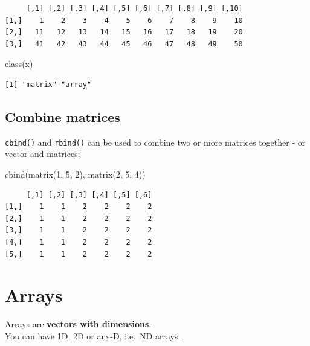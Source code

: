 \documentclass[
]{book}
\newenvironment{Shaded}{\begin{snugshade}}{\end{snugshade}}
\newcommand{\DecValTok}[1]{\textcolor[rgb]{0.00,0.00,0.81}{#1}}
\newcommand{\FunctionTok}[1]{\textcolor[rgb]{0.00,0.00,0.00}{#1}}
\newcommand{\NormalTok}[1]{#1}
\begin{document}
\begin{verbatim}
     [,1] [,2] [,3] [,4] [,5] [,6] [,7] [,8] [,9] [,10]
[1,]    1    2    3    4    5    6    7    8    9    10
[2,]   11   12   13   14   15   16   17   18   19    20
[3,]   41   42   43   44   45   46   47   48   49    50
\end{verbatim}

\begin{Shaded}
\begin{Highlighting}[]
\FunctionTok{class}\NormalTok{(x)}
\end{Highlighting}
\end{Shaded}

\begin{verbatim}
[1] "matrix" "array" 
\end{verbatim}

\hypertarget{combine-matrices}{%
\subsection{Combine matrices}\label{combine-matrices}}

\texttt{cbind()} and \texttt{rbind()} can be used to combine two or more matrices together - or vector and matrices:

\begin{Shaded}
\begin{Highlighting}[]
\FunctionTok{cbind}\NormalTok{(}\FunctionTok{matrix}\NormalTok{(}\DecValTok{1}\NormalTok{, }\DecValTok{5}\NormalTok{, }\DecValTok{2}\NormalTok{), }\FunctionTok{matrix}\NormalTok{(}\DecValTok{2}\NormalTok{, }\DecValTok{5}\NormalTok{, }\DecValTok{4}\NormalTok{))}
\end{Highlighting}
\end{Shaded}

\begin{verbatim}
     [,1] [,2] [,3] [,4] [,5] [,6]
[1,]    1    1    2    2    2    2
[2,]    1    1    2    2    2    2
[3,]    1    1    2    2    2    2
[4,]    1    1    2    2    2    2
[5,]    1    1    2    2    2    2
\end{verbatim}

\hypertarget{arrays}{%
\section{Arrays}\label{arrays}}

Arrays are \textbf{vectors with dimensions}.\\
You can have 1D, 2D or any-D, i.e.~ND arrays.
\end{document}

